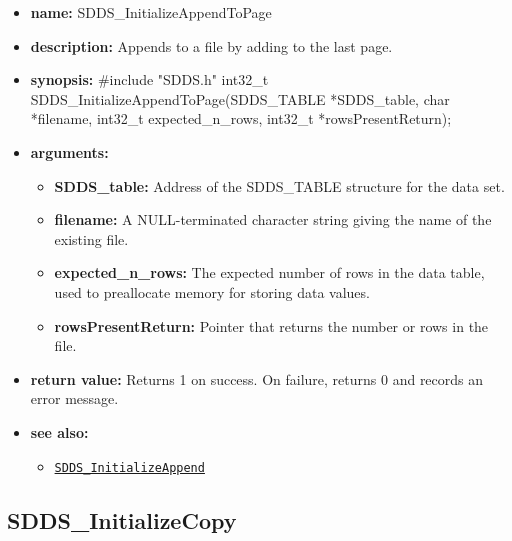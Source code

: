 \documentclass[11pt]{article}
\newcommand{\progref}[1]{\hyperref[SDDS_#1]{\tt SDDS\_#1}}
\begin{document}
\begin{itemize}
\item {\bf name:}\newline
SDDS\_InitializeAppendToPage
\item {\bf description:}\newline
Appends to a file by adding to the last page.
\item {\bf synopsis:} \#include "SDDS.h"\newline
int32\_t SDDS\_InitializeAppendToPage(SDDS\_TABLE *SDDS\_table, char *filename, int32\_t expected\_n\_rows, int32\_t *rowsPresentReturn);
\item {\bf arguments:}
\begin{itemize}
\item {\bf SDDS\_table:} Address of the SDDS\_TABLE structure for the data set.
\item {\bf filename:} A NULL-terminated character string giving the name of the existing file.
\item {\bf expected\_n\_rows:} The expected number of rows in the data table, used to preallocate memory for storing data values.
\item {\bf rowsPresentReturn:} Pointer that returns the number or rows in the file.
\end{itemize}
\item {\bf return value:}\newline
Returns 1 on success. On failure, returns 0 and records an error message.
\item {\bf see also:}
\begin{itemize}
\item \progref{InitializeAppend}
\end{itemize}
\end{itemize}

\subsection{SDDS\_InitializeCopy}
\label{SDDS_InitializeCopy}
\end{document}
